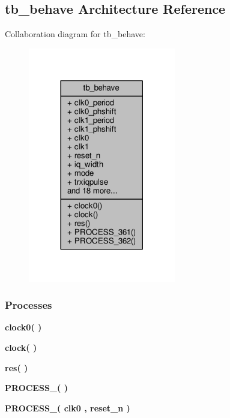 \subsection{tb\+\_\+behave Architecture Reference}
\label{classsmpl__cmp__tb_1_1tb__behave}


Collaboration diagram for tb\+\_\+behave\+:\nopagebreak
\begin{figure}[H]
\begin{center}
\leavevmode
\includegraphics[width=182pt]{d5/d79/classsmpl__cmp__tb_1_1tb__behave__coll__graph}
\end{center}
\end{figure}
\subsubsection*{Processes}
 \begin{DoxyCompactItemize}
\item 
{\bf clock0}{\bfseries  (  )}
\item 
{\bf clock}{\bfseries  (  )}
\item 
{\bf res}{\bfseries  (  )}
\item 
{\bf P\+R\+O\+C\+E\+S\+S\+\_}{\bfseries  (  )}
\item 
{\bf P\+R\+O\+C\+E\+S\+S\+\_}{\bfseries  ( {\bfseries {\bfseries {\bf clk0}} \textcolor{vhdlchar}{ }} , {\bfseries {\bfseries {\bf reset\+\_\+n}} \textcolor{vhdlchar}{ }} )}
\end{DoxyCompactItemize}
